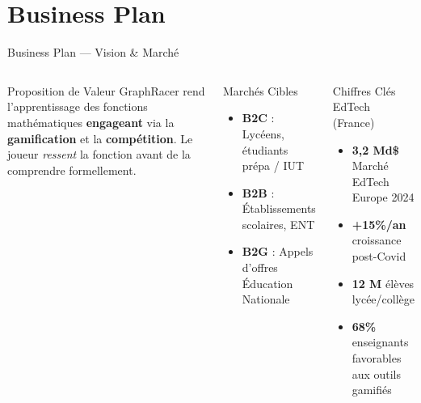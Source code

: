 \documentclass[aspectratio=169,12pt]{beamer}
\begin{document}
\section{Business Plan}

\begin{frame}{Business Plan --- Vision \& March\'e}
  \begin{columns}
    \begin{block}{Proposition de Valeur}
      GraphRacer rend l'apprentissage des fonctions math\'ematiques
      \textbf{engageant} via la \textbf{gamification} et la \textbf{comp\'etition}.
      Le joueur \textit{ressent} la fonction avant de la comprendre formellement.
    \end{block}
    \vspace{0.3cm}
    \begin{block}{March\'es Cibles}
      \begin{itemize}
        \item \textbf{B2C} : Lyc\'eens, \'etudiants pr\'epa / IUT
        \item \textbf{B2B} : \'Etablissements scolaires, ENT
        \item \textbf{B2G} : Appels d'offres \'Education Nationale
      \end{itemize}
    \end{block}
    \begin{exampleblock}{Chiffres Cl\'es EdTech (France)}
      \begin{itemize}
        \item \textbf{3,2 Md\$} March\'e EdTech Europe 2024
        \item \textbf{+15\%/an} croissance post-Covid
        \item \textbf{12 M} \'el\`eves lyc\'ee/coll\`ege
        \item \textbf{68\%} enseignants favorables aux outils gamifi\'es
      \end{itemize}
    \end{exampleblock}
  \end{columns}
\end{frame}
\end{document}
